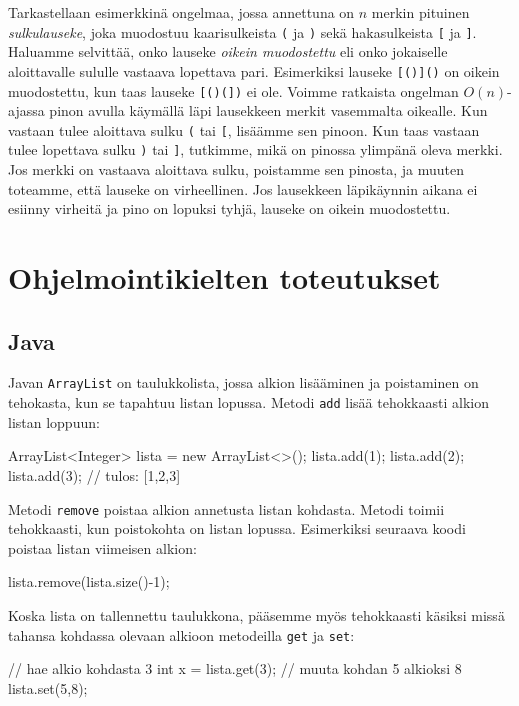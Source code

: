 Tarkastellaan esimerkkinä ongelmaa, jossa annettuna on
$n$ merkin pituinen \emph{sulkulauseke}, 
joka muodostuu kaarisulkeista \texttt{(} ja \texttt{)} sekä
hakasulkeista \texttt{[} ja \texttt{]}.
Haluamme selvittää, onko lauseke \emph{oikein muodostettu} eli
onko jokaiselle aloittavalle sululle vastaava lopettava pari.
Esimerkiksi lauseke \texttt{[()]()} on oikein muodostettu,
kun taas lauseke \texttt{[()(])} ei ole.
Voimme ratkaista ongelman $O(n)$-ajassa pinon avulla
käymällä läpi lausekkeen merkit vasemmalta oikealle.
Kun vastaan tulee aloittava sulku \texttt{(} tai \texttt{[},
lisäämme sen pinoon.
Kun taas vastaan tulee lopettava sulku \texttt{)} tai \texttt{]},
tutkimme, mikä on pinossa ylimpänä oleva merkki.
Jos merkki on vastaava aloittava sulku,
poistamme sen pinosta, ja muuten toteamme, että lauseke on virheellinen.
Jos lausekkeen läpikäynnin aikana ei esiinny virheitä
ja pino on lopuksi tyhjä, lauseke on oikein muodostettu.

\section{Ohjelmointikielten toteutukset}

\subsection{Java}

Javan \texttt{ArrayList} on taulukkolista,
jossa alkion lisääminen ja poistaminen on tehokasta,
kun se tapahtuu listan lopussa.
Metodi \texttt{add} lisää tehokkaasti alkion listan loppuun:

\begin{code}
ArrayList<Integer> lista = new ArrayList<>();
lista.add(1);
lista.add(2);
lista.add(3);
// tulos: [1,2,3]
\end{code}

Metodi \texttt{remove} poistaa alkion
annetusta listan kohdasta.
Metodi toimii tehokkaasti, kun poistokohta on listan lopussa.
Esimerkiksi seuraava koodi poistaa listan viimeisen alkion:

\begin{code}
lista.remove(lista.size()-1);
\end{code}

Koska lista on tallennettu taulukkona,
pääsemme myös tehokkaasti käsiksi missä tahansa kohdassa
olevaan alkioon metodeilla \texttt{get} ja \texttt{set}:

\begin{code}
// hae alkio kohdasta 3
int x = lista.get(3);
// muuta kohdan 5 alkioksi 8
lista.set(5,8);
\end{code}

